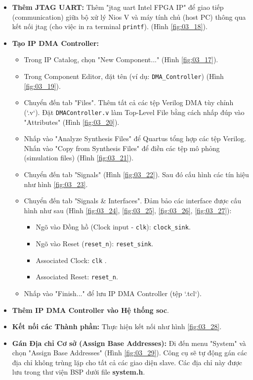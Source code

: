 \begin{enumerate}
\begin{itemize}
        \item \textbf{Thêm JTAG UART:} Thêm "\acrshort{jtag} \acrshort{uart} Intel FPGA IP" để giao tiếp (communication) giữa bộ xử lý Nios V và máy tính chủ (host PC) thông qua kết nối \acrshort{jtag} (cho việc in ra terminal \texttt{printf}). (Hình \ref{fig:03_18}).
        \item \textbf{Tạo IP DMA Controller:}
        \begin{itemize}
            \item Trong IP Catalog, chọn "New Component..." (Hình \ref{fig:03_17}).
            \item Trong Component Editor, đặt tên (ví dụ: \texttt{DMA\_Controller}) (Hình \ref{fig:03_19}).
            \item Chuyển đến tab "Files". Thêm tất cả các tệp Verilog DMA tùy chỉnh (`.v`). Đặt \texttt{DMAController.v} làm Top-Level File bằng cách nhấp đúp vào "Attributes" (Hình \ref{fig:03_20}). 
            \item Nhấp vào "Analyze Synthesis Files" để Quartus tổng hợp các tệp Verilog. Nhấn vào "Copy from Synthesis Files" để điền các tệp mô phỏng (simulation files) (Hình \ref{fig:03_21}).
            \item Chuyển đến tab "Signals" (Hình \ref{fig:03_22}). Sau đó cấu hình các tín hiệu như hình \ref{fig:03_23}. 
            \item Chuyển đến tab "Signals \& Interfaces". Đảm bảo các interface được cấu hình như sau (Hình \ref{fig:03_24}, \ref{fig:03_25}, \ref{fig:03_26}, \ref{fig:03_27}):
            \begin{itemize}
                \item Ngõ vào Đồng hồ (Clock input - \texttt{clk}): \texttt{clock\_sink}.
                \item Ngõ vào Reset (\texttt{reset\_n}): \texttt{reset\_sink}.
                \item Associated Clock: \texttt{clk} .
                \item Associated Reset: \texttt{reset\_n}.
            \end{itemize}
            \item Nhấp vào "Finish..." để lưu IP DMA Controller (tệp `.tcl`).
        \end{itemize}
        \item \textbf{Thêm IP DMA Controller vào Hệ thống \acrshort{soc}}.
        \item \textbf{Kết nối các Thành phần:} Thực hiện kết nối như hình \ref{fig:03_28}.
        \item \textbf{Gán Địa chỉ Cơ sở (Assign Base Addresses):} Đi đến menu "System" và chọn "Assign Base Addresses" (Hình \ref{fig:03_29}). Công cụ sẽ tự động gán các địa chỉ không trùng lặp cho tất cả các giao diện slave. Các địa chỉ này được lưu trong thư viện BSP dưới file \textbf{system.h}.

\end{itemize}
\end{enumerate}
